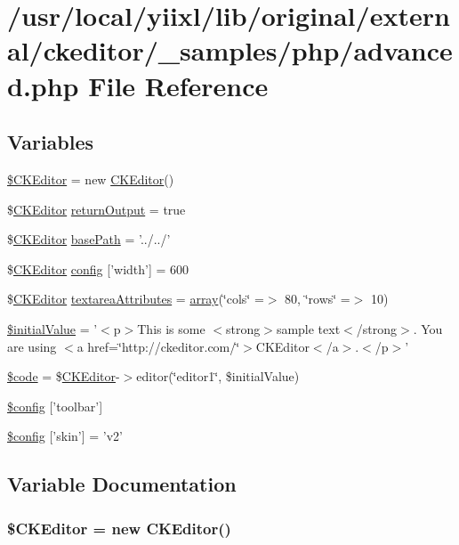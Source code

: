 \hypertarget{advanced_8php}{
\section{/usr/local/yiixl/lib/original/external/ckeditor/\_\-samples/php/advanced.php File Reference}
\label{advanced_8php}
}
\subsection*{Variables}
\begin{DoxyCompactItemize}
\item 
\hyperlink{advanced_8php_aec6d261a24c9dcb30ee1cfa7762a4a44}{\$CKEditor} = new \hyperlink{classCKEditor}{CKEditor}()
\item 
\$\hyperlink{classCKEditor}{CKEditor} \hyperlink{advanced_8php_a124ae4ee461e572dc24e6be964499bf0}{returnOutput} = true
\item 
\$\hyperlink{classCKEditor}{CKEditor} \hyperlink{advanced_8php_a94a267f018012b013582daafb6a89618}{basePath} = '../../'
\item 
\$\hyperlink{classCKEditor}{CKEditor} \hyperlink{advanced_8php_a3f176ffce3afa63656bfc989470e3e24}{config} \mbox{[}'width'\mbox{]} = 600
\item 
\$\hyperlink{classCKEditor}{CKEditor} \hyperlink{advanced_8php_a661a342adc5c319c4cb41b8447768048}{textareaAttributes} = \hyperlink{list_8php_aa3205d038c7f8feb5c9f01ac4dfadc88}{array}(\char`\"{}cols\char`\"{} =$>$ 80, \char`\"{}rows\char`\"{} =$>$ 10)
\item 
\hyperlink{advanced_8php_ab352e6e5b00f0a2533b1b64b8306e95f}{\$initialValue} = '$<$p$>$This is some $<$strong$>$sample text$<$/strong$>$. You are using $<$a href=\char`\"{}http://ckeditor.com/\char`\"{}$>$CKEditor$<$/a$>$.$<$/p$>$'
\item 
\hyperlink{advanced_8php_a7949acdaecc70b9f035c12a7069db132}{\$code} = \$\hyperlink{classCKEditor}{CKEditor}-\/$>$editor(\char`\"{}editor1\char`\"{}, \$initialValue)
\item 
\hyperlink{advanced_8php_aea8fdfb38b8f02d1fc431d35e6dfc892}{\$config} \mbox{[}'toolbar'\mbox{]}
\item 
\hyperlink{advanced_8php_af8100404abeff7893027ca7ef204e4a7}{\$config} \mbox{[}'skin'\mbox{]} = 'v2'
\end{DoxyCompactItemize}


\subsection{Variable Documentation}
\hypertarget{advanced_8php_aec6d261a24c9dcb30ee1cfa7762a4a44}{
\subsubsection[{\$CKEditor}]{\setlength{\rightskip}{0pt plus 5cm}\${\bf CKEditor} = new {\bf CKEditor}()}}
\label{advanced_8php_aec6d261a24c9dcb30ee1cfa7762a4a44}


